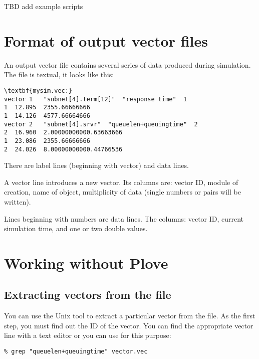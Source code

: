 TBD add example scripts





\section{Format of output vector files}

An output vector file contains several
series of data produced during simulation. The file is textual, it
looks like this:

\begin{Verbatim}[commandchars=\\\{\}]
\textbf{mysim.vec:}
vector 1   "subnet[4].term[12]"  "response time"  1
1  12.895  2355.66666666
1  14.126  4577.66664666
vector 2   "subnet[4].srvr"  "queuelen+queuingtime"  2
2  16.960  2.00000000000.63663666
1  23.086  2355.66666666
2  24.026  8.00000000000.44766536
\end{Verbatim}


There are label lines (beginning with vector) and data lines.

A vector line introduces a new vector. Its columns are: vector ID,
module of creation, name of  object, multiplicity
of data (single numbers or pairs will be written).

Lines beginning with numbers are data lines. The columns: vector 
ID, current simulation time, and one or two double values.





\section{Working without Plove}

\subsection{Extracting vectors from the file}

You can use the Unix  tool to extract a particular vector
from the file. As the first step, you must find out the ID of the
vector. You can find the appropriate vector line with a text editor or
you can use  for this purpose:

\begin{Verbatim}
% grep "queuelen+queuingtime" vector.vec
\end{Verbatim}


